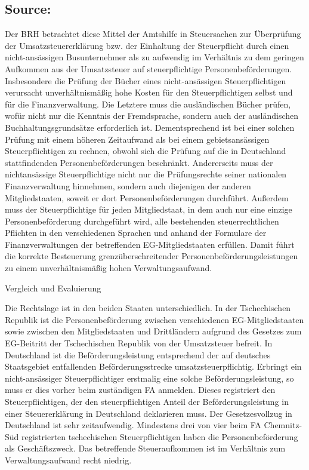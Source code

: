 \documentclass[10pt]{article}
\begin{document}
\subsection*{Source:}

Der BRH betrachtet diese Mittel der Amtshilfe in Steuersachen zur Überprüfung der Umsatzsteuererklärung bzw. der Einhaltung der Steuerpﬂicht durch einen nicht-ansässigen Busunternehmer als zu aufwendig im Verhältnis zu dem geringen Aufkommen aus der Umsatzsteuer auf steuerpﬂichtige Personenbeförderungen.
Insbesondere die Prüfung der Bücher eines nicht-ansässigen Steuerpﬂichtigen verursacht unverhältnismäßig hohe Kosten für den Steuerpﬂichtigen selbst und für die Finanzverwaltung.
Die Letztere muss die ausländischen Bücher prüfen, wofür nicht nur die Kenntnis der Fremdsprache, sondern auch der ausländischen Buchhaltungsgrundsätze erforderlich ist.
Dementsprechend ist bei einer solchen Prüfung mit einem höheren Zeitaufwand als bei einem gebietsansässigen Steuerpﬂichtigen zu rechnen, obwohl sich die Prüfung auf die in Deutschland stattﬁndenden Personenbeförderungen beschränkt.
Andererseits muss der nichtansässige Steuerpﬂichtige nicht nur die Prüfungsrechte seiner nationalen Finanzverwaltung hinnehmen, sondern auch diejenigen der anderen Mitgliedstaaten, soweit er dort Personenbeförderungen durchführt.
Außerdem muss der Steuerpﬂichtige für jeden Mitgliedstaat, in dem auch nur eine einzige Personenbeförderung durchgeführt wird, alle bestehenden steuerrechtlichen Pﬂichten in den verschiedenen Sprachen und anhand der Formulare der Finanzverwaltungen der betreffenden EG-Mitgliedstaaten erfüllen.
Damit führt die korrekte Besteuerung grenzüberschreitender Personenbeförderungsleistungen zu einem unverhältnismäßig hohen Verwaltungsaufwand.


Vergleich und Evaluierung

Die Rechtslage ist in den beiden Staaten unterschiedlich.
In der Tschechischen Republik ist die Personenbeförderung zwischen verschiedenen EG-Mitgliedstaaten sowie zwischen den Mitgliedstaaten und Drittländern aufgrund des Gesetzes zum EG-Beitritt der Tschechischen Republik von der Umsatzsteuer befreit.
In Deutschland ist die Beförderungsleistung entsprechend der auf deutsches Staatsgebiet entfallenden Beförderungsstrecke umsatzsteuerpﬂichtig.
Erbringt ein nicht-ansässiger Steuerpﬂichtiger erstmalig eine solche Beförderungsleistung, so muss er dies vorher beim zuständigen FA anmelden.
Dieses registriert den Steuerpﬂichtigen, der den steuerpﬂichtigen Anteil der Beförderungsleistung in einer Steuererklärung in Deutschland deklarieren muss.
Der Gesetzesvollzug in Deutschland ist sehr zeitaufwendig.
Mindestens drei von vier beim FA Chemnitz-Süd registrierten tschechischen Steuerpﬂichtigen haben die Personenbeförderung als Geschäftszweck.
Das betreffende Steueraufkommen ist im Verhältnis zum Verwaltungsaufwand recht niedrig.
\end{document}
